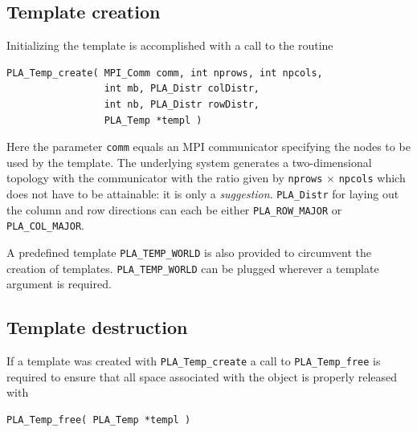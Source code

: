 \subsection{Template creation}

Initializing the template is accomplished with a call to the routine
\begin{FlaSpec}
\begin{verbatim}
PLA_Temp_create( MPI_Comm comm, int nprows, int npcols, 
                 int mb, PLA_Distr colDistr, 
                 int nb, PLA_Distr rowDistr, 
                 PLA_Temp *templ )
\end{verbatim}
\end{FlaSpec}
Here the parameter {\tt comm} equals an MPI communicator specifying
the nodes to be used by the template.  The underlying system
generates a two-dimensional topology with the communicator with
the ratio given by {\tt nprows} $\times$ {\tt npcols} which 
does not have to be attainable: it is only a {\em suggestion}.
{\tt PLA\_Distr} for laying out the column and row directions can each be
either {\tt PLA\_ROW\_MAJOR} or {\tt PLA\_COL\_MAJOR}.

A predefined template {\tt PLA\_TEMP\_WORLD} is also provided to circumvent
the creation of templates.  {\tt PLA\_TEMP\_WORLD} can be plugged
wherever a template argument is required.


\subsection{Template destruction}

If a template was created with {\tt PLA\_Temp\_create} a call to 
{\tt PLA\_Temp\_free} is required to ensure
that all space associated with the object is 
properly released with
\begin{FlaSpec}
\begin{verbatim}
PLA_Temp_free( PLA_Temp *templ )
\end{verbatim}
\end{FlaSpec}



